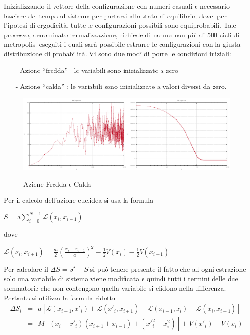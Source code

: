 Inizializzando il vettore della configurazione con numeri casuali è necessario lasciare del tempo al sistema per portarsi allo stato di equilibrio, dove, per l'ipotesi di ergodicità, tutte le configurazioni possibili sono equiprobabili. Tale processo, denominato termalizzazione, richiede di norma non più di 500 cicli di metropolis, eseguiti i quali sarà possibile estrarre le configurazioni con la giusta distribuzione di probabilità. Vi sono due modi di porre le condizioni iniziali:
\begin{itemize}
   \small
   \item[-] Azione ``fredda'' : le variabili sono inizializzate a zero.
   \item[-] Azione ``calda'' : le variabili sono inizializzate a valori diversi da zero.
\end{itemize}
\begin{figure}[h]
\centering
\includegraphics[width=0.5\textwidth]{action1}\includegraphics[width=0.5\textwidth]{action2}
\caption{Azione Fredda e Calda}
\label{fig:action}
\end{figure}
Per il calcolo dell'azione euclidea si usa la formula
\begin{center}$S = a\displaystyle\sum\limits_{i=0}^{N-1} \mathcal{L}(x_{i},x_{i+1})$\end{center}
dove
\begin{center}$\mathcal{L}(x_{i},x_{i+1}) = \frac{m}{2}\left(\frac{x_{i}-x_{i+1}}{a}\right)^{2}-\frac{1}{2}V(x_{i})-\frac{1}{2}V(x_{i+1})$\end{center}
Per calcolare il $\Delta S = S'-S$ si può tenere presente il fatto che ad ogni estrazione solo una variabile di sistema viene modificata e quindi tutti i termini delle due sommatorie che non contengono quella variabile si elidono nella differenza. Pertanto si utilizza la formula ridotta
\begin{eqnarray*}
 \Delta S_i &=& a[\mathcal{L}(x_{i-1},x'_{i})+\mathcal{L}(x'_{i},x_{i+1})-\mathcal{L}(x_{i-1},x_{i})-\mathcal{L}(x_{i},x_{i+1})]\\
   &=& M[(x_{i}-x'_{i})(x_{i+1}+x_{i-1})+(x'^2_i-x^2_i)]+V(x'_i)-V(x_i)
\end{eqnarray*}

